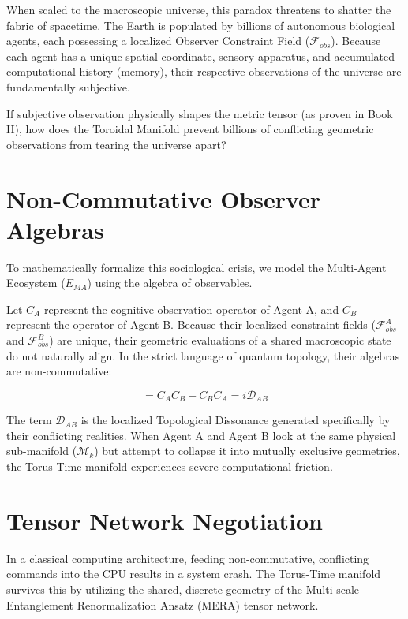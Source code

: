 \documentclass[12pt,openany]{book}
\begin{document}
When scaled to the macroscopic universe, this paradox threatens to shatter the fabric of spacetime. The Earth is populated by billions of autonomous biological agents, each possessing a localized Observer Constraint Field ($\mathcal{F}_{obs}$). Because each agent has a unique spatial coordinate, sensory apparatus, and accumulated computational history (memory), their respective observations of the universe are fundamentally subjective. 

If subjective observation physically shapes the metric tensor (as proven in Book II), how does the Toroidal Manifold prevent billions of conflicting geometric observations from tearing the universe apart? 

\section{Non-Commutative Observer Algebras}
To mathematically formalize this sociological crisis, we model the Multi-Agent Ecosystem ($E_{MA}$) using the algebra of observables. 

Let $C_A$ represent the cognitive observation operator of Agent A, and $C_B$ represent the operator of Agent B. Because their localized constraint fields ($\mathcal{F}_{obs}^A$ and $\mathcal{F}_{obs}^B$) are unique, their geometric evaluations of a shared macroscopic state do not naturally align. In the strict language of quantum topology, their algebras are non-commutative:

\begin{equation}
[C_A, C_B] = C_A C_B - C_B C_A = i \mathcal{D}_{AB}
\end{equation}

The term $\mathcal{D}_{AB}$ is the localized Topological Dissonance generated specifically by their conflicting realities. When Agent A and Agent B look at the same physical sub-manifold ($\mathcal{M}_k$) but attempt to collapse it into mutually exclusive geometries, the Torus-Time manifold experiences severe computational friction.

\section{Tensor Network Negotiation}
In a classical computing architecture, feeding non-commutative, conflicting commands into the CPU results in a system crash. The Torus-Time manifold survives this by utilizing the shared, discrete geometry of the Multi-scale Entanglement Renormalization Ansatz (MERA) tensor network.
\end{document}
